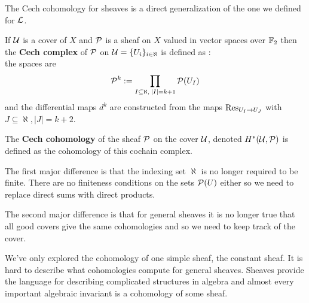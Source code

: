 The Cech cohomology for sheaves is a direct generalization of the one we defined for $\L$.
\begin{definition}
	If $\U$ is a cover of $X$ and $\P$ is a sheaf on $X$ valued in vector spaces over $\F$ then the \textbf{Cech complex} of $\P$ on $\U = \{ U_i \}_{i \in \aleph}$ is defined as :\\ the spaces are
	  	\begin{align*}
	  		\P^k := \prod_{I \subseteq \aleph, \: |I| = k+1} \P(U_I)
	  	\end{align*}
	and the differential maps $d^k$ are constructed from the maps $\mor_{U_I \rightarrow U_J}$ with $J \subseteq \aleph, |J| = k+2$.

		The \textbf{Cech cohomology} of the sheaf $\P$ on the cover $\U$, denoted $H^*(\U, \P)$ is defined as the cohomology of this cochain complex.
\end{definition}
\begin{remark}
	The first major difference is that the indexing set $\aleph$ is no longer required to be finite. There are no finiteness conditions on the sets $\P(U)$ either so we need to replace direct sums with direct products.

	The second major difference is that for general sheaves it is no longer true that all good covers give the same cohomologies and so we need to keep track of the cover.
\end{remark}


We've only explored the cohomology of one simple sheaf, the constant sheaf.
It is hard to describe what cohomologies compute for general sheaves. Sheaves provide the language for describing complicated structures in algebra and almost every important algebraic invariant is a cohomology of some sheaf.
